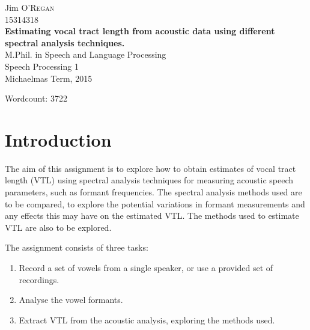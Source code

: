 \documentclass[11pt]{article}
\begin{document}
\begin{titlepage}

\newcommand{\HRule}{\rule{\linewidth}{0.5mm}}

\center

\begin{minipage}{0.8\textwidth}
\begin{flushleft} \large
Jim \textsc{O'Regan}
\\
{\large 15314318} \\[1.5cm]

{ \large \bfseries Estimating vocal tract length from acoustic data using different spectral analysis techniques.}\\[1.5cm]

M.Phil. in Speech and Language Processing
\\
{\large Speech Processing 1} \\
{\large Michaelmas Term, 2015}
\end{flushleft}
\end{minipage}

\begin{minipage}[t][10cm][b]{0.5\textwidth}
\begin{flushleft} \large
Wordcount: 3722
\\
\end{flushleft}
\end{minipage}


\vfill

\end{titlepage}

\section{Introduction}

The aim of this assignment is to explore how to obtain estimates of vocal tract length (VTL) using spectral analysis techniques for measuring acoustic speech parameters, such as formant frequencies. The spectral analysis methods used are to be compared, to explore the potential variations in formant measurements and any effects this may have on the estimated VTL. The methods used to estimate VTL are also to be explored.

The assignment consists of three tasks:

\begin{enumerate}
\item Record a set of vowels from a single speaker, or use a provided set of recordings.
\item Analyse the vowel formants.
\item Extract VTL from the acoustic analysis, exploring the methods used.
\end{enumerate}
\end{document}
